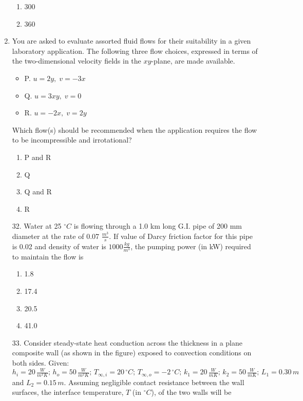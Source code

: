 \documentclass[journal]{IEEEtran}
\begin{document}
\begin{enumerate}
\begin{enumerate}
    \item  300
    \item  360
  \end{enumerate}
  \item You are asked to evaluate assorted fluid flows for their suitability in a given laboratory application. The following three flow choices, expressed in terms of the two-dimensional velocity fields in the $xy$-plane, are made available.
\begin{itemize}
    \item P. $u = 2y, \; v = -3x$
    \item Q. $u = 3xy, \; v = 0$
    \item R. $u = -2x, \; v = 2y$
\end{itemize}
Which flow(s) should be recommended when the application requires the flow to be incompressible and irrotational?
\begin{enumerate}
    \item  P and R
    \item  Q
    \item  Q and R
    \item  R
  \end{enumerate}
\item[32.] Water at 25 $^\circ C$ is flowing through a 1.0 km long G.I. pipe of 200 mm diameter at the rate of 0.07 $\frac{m^3}{s}$. If value of Darcy friction factor for this pipe is 0.02 and density of water is $1000 \frac{kg}{m^3}$, the pumping power (in kW) required to maintain the flow is
\begin{enumerate}
    \item  1.8
    \item  17.4
    \item  20.5
    \item  41.0
  \end{enumerate}
  \item[33.] Consider steady-state heat conduction across the thickness in a plane composite wall (as shown in the figure) exposed to convection conditions on both sides.
Given: $h_i = 20 \, \frac{W}{m^2K}; \, h_o = 50 \, \frac{W}{m^2K}; \, T_{\infty,i} = 20 \,^\circ C; \, T_{\infty,o} = -2 \,^\circ C; \, k_1 = 20 \, \frac{W}{mK}; \, k_2 = 50 \, \frac{W}{mK}; \, L_1 = 0.30 \, m$ and $L_2 = 0.15 \, m$. 
Assuming negligible contact resistance between the wall surfaces, the interface temperature, $T$ (in $^\circ C$), of the two walls will be
 \begin{figure}[!ht]
    \centering

\end{figure}
\end{enumerate}
\end{document}
